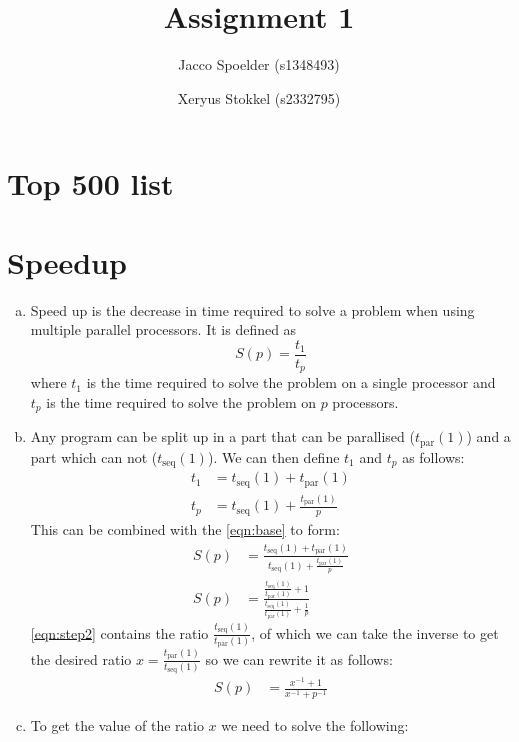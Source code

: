 \documentclass[a4paper]{article}
\title{Assignment 1}
\author{Jacco Spoelder (s1348493) \and Xeryus Stokkel (s2332795)}
\begin{document}
\maketitle

\section{Top 500 list}

\section{Speedup}
\begin{enumerate}[(a)]
	\item Speed up is the decrease in time required to solve a problem when using multiple parallel processors. It is defined as
		\begin{equation}
			S(p) = \frac{t_1}{t_p} \label{eqn:base}
		\end{equation}
		where $t_1$ is the time required to solve the problem on a single processor and $t_p$ is the time required to solve the problem on $p$ processors.
	\item Any program can be split up in a part that can be parallised ($t_\text{par}(1)$) and a part which can not ($t_\text{seq}(1)$). We can then define $t_1$ and $t_p$ as follows:
		\begin{align*}
			t_1 &= t_\text{seq}(1) + t_\text{par}(1) \\
			t_p &= t_\text{seq}(1) + \frac{t_\text{par}(1)}{p}
		\end{align*}
		This can be combined with the \autoref{eqn:base} to form:
		\begin{align}
			S(p) &= \frac{t_\text{seq}(1) + t_\text{par}(1)}{t_\text{seq}(1) + \frac{t_\text{par}(1)}{p}} \nonumber \\
			S(p) &= \frac{\frac{t_\text{seq}(1)}{t_\text{par}(1)} + 1}{\frac{t_\text{seq}(1)}{t_\text{par}(1)} + \frac{1}{p}} \label{eqn:step2}
		\end{align}
		\autoref{eqn:step2} contains the ratio $\displaystyle \frac{t_\text{seq}(1)}{t_\text{par}(1)}$, of which we can take the inverse to get the desired ratio $\displaystyle x = \frac{t_\text{par}(1)}{t_\text{seq}(1)}$ so we can rewrite it as follows:
		\begin{align*}
			S(p) &= \frac{x^{-1} + 1}{x^{-1} + p^{-1}}
		\end{align*}
	\item To get the value of the ratio $x$ we need to solve the following:

\end{enumerate}
\end{document}
